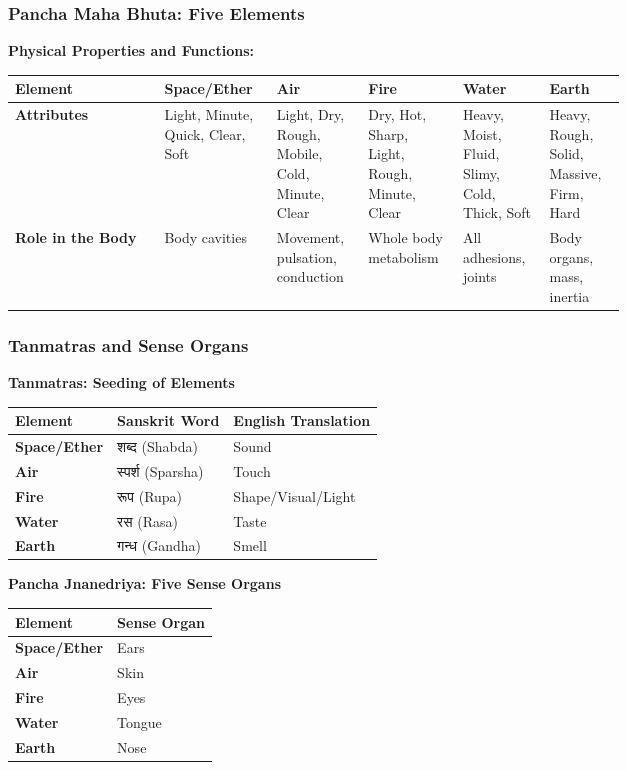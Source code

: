\begin{frame}[fragile]\frametitle{Pancha Maha Bhuta: Five Elements}

    \textbf{Physical Properties and Functions:}
        \begin{tabular}{|p{0.21\linewidth}|p{0.1\linewidth}|p{0.1\linewidth}|p{0.1\linewidth}|p{0.1\linewidth}|p{0.1\linewidth}|}
    \hline
    \textbf{Element} & \textbf{Space/Ether} & \textbf{Air} & \textbf{Fire} & \textbf{Water} & \textbf{Earth} \\
    \hline
    \textbf{Attributes} & Light, Minute, Quick, Clear, Soft & Light, Dry, Rough, Mobile, Cold, Minute, Clear & Dry, Hot, Sharp, Light, Rough, Minute, Clear & Heavy, Moist, Fluid, Slimy, Cold, Thick, Soft & Heavy, Rough, Solid, Massive, Firm, Hard \\
    \hline
    \textbf{Role in the Body} & Body cavities & Movement, pulsation, conduction & Whole body metabolism & All adhesions, joints & Body organs, mass, inertia \\
    \hline
    \end{tabular}

\end{frame}


\begin{frame}[fragile]\frametitle{Tanmatras and Sense Organs}
    \textbf{Tanmatras: Seeding of Elements}
    \begin{tabular}{|l|l|l|}
    \hline
    \textbf{Element} & \textbf{Sanskrit Word} & \textbf{English Translation} \\
    \hline
    \textbf{Space/Ether} & शब्द (Shabda) & Sound \\
    \hline
    \textbf{Air} & स्पर्श (Sparsha) & Touch \\
    \hline
    \textbf{Fire} & रूप (Rupa) & Shape/Visual/Light \\
    \hline
    \textbf{Water} & रस (Rasa) & Taste \\
    \hline
    \textbf{Earth} & गन्ध (Gandha) & Smell \\
    \hline
    \end{tabular}


    \textbf{Pancha Jnanedriya: Five Sense Organs}
	
    \begin{tabular}{|l|l|}
    \hline
    \textbf{Element} & \textbf{Sense Organ} \\
    \hline
    \textbf{Space/Ether} & Ears \\
    \hline
    \textbf{Air} & Skin \\
    \hline
    \textbf{Fire} & Eyes \\
    \hline
    \textbf{Water} & Tongue \\
    \hline
    \textbf{Earth} & Nose \\
    \hline
    \end{tabular}
\end{frame}

